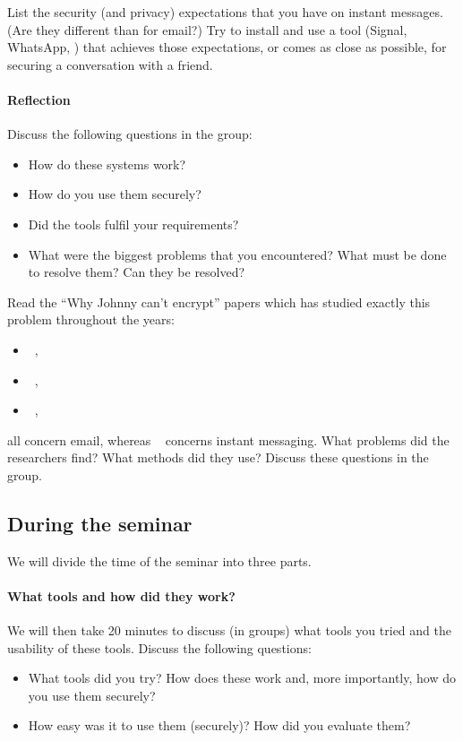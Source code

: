 List the security (and privacy) expectations that you have on instant messages.
(Are they different than for email?)
Try to install and use a tool (\eg Signal, WhatsApp, \etc) that achieves those 
expectations, or comes as close as possible, for securing a conversation with a 
friend.

\paragraph{Reflection}

Discuss the following questions in the group:
\begin{itemize}
  \item How do these systems work?
  \item How do you use them securely?
  \item Did the tools fulfil your requirements?
  \item What were the biggest problems that you encountered?
    What must be done to resolve them?
    Can they be resolved?
\end{itemize}

Read the \enquote{Why Johnny can't encrypt} papers which has studied exactly 
this problem throughout the years:
\begin{itemize}
  \item {}~\cite{WhyJohnnyCantEncrypt},
  \item {}~\cite{WhyJohnnyStillCantEncrypt},
  \item {}~\cite{WhyJohnnyStillStillCantEncrypt},
\end{itemize}
all concern email, whereas 
~\cite{CanJohnnyFinallyEncrypt} concerns 
instant messaging.
What problems did the researchers find?
What methods did they use?
Discuss these questions in the group.

\subsection{During the seminar}

We will divide the time of the seminar into three parts.

\paragraph{What tools and how did they work?}

We will then take 20 minutes to discuss (in groups) what tools you tried and 
the usability of these tools.
Discuss the following questions:
\begin{itemize}
  \item What tools did you try?
    How does these work and, more importantly, how do you use them securely?

  \item How easy was it to use them (securely)?
    How did you evaluate them?
\end{itemize}

